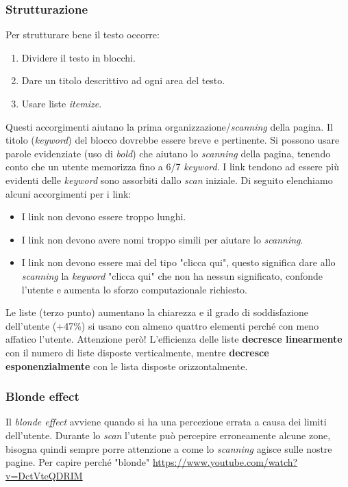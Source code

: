 			\subsubsection{Strutturazione}
				Per strutturare bene il testo occorre:
				\begin{enumerate}
					\item Dividere il testo in blocchi.
					\item Dare un titolo descrittivo ad ogni area del testo.
					\item Usare liste \emph{itemize}.
				\end{enumerate}
				Questi accorgimenti aiutano la prima organizzazione/\emph{scanning} della pagina. Il titolo (\emph{keyword}) del blocco dovrebbe essere breve e pertinente. Si possono usare parole evidenziate (uso di \emph{bold}) che aiutano lo \emph{scanning} della pagina, tenendo conto che un utente memorizza fino a 6/7 \emph{keyword}.
				I link tendono ad essere più evidenti delle \emph{keyword} sono assorbiti dallo \emph{scan} iniziale. Di seguito elenchiamo alcuni accorgimenti per i link:
				\begin{itemize}
					\item I link non devono essere troppo lunghi.
					\item I link non devono avere nomi troppo simili per aiutare lo \emph{scanning}.
					\item I link non devono essere mai del tipo "clicca qui", questo significa dare allo \emph{scanning} la \emph{keyword} "clicca qui" che non ha nessun significato, confonde l'utente e aumenta lo sforzo computazionale richiesto.
				\end{itemize}
				Le liste (terzo punto) aumentano la chiarezza e il grado di soddisfazione dell'utente (+47\%) si usano con almeno quattro elementi perché con meno affatico l'utente. Attenzione però! L'efficienza delle liste \textbf{decresce linearmente} con il numero di liste disposte verticalmente, mentre \textbf{decresce esponenzialmente} con le lista disposte orizzontalmente.
				
			\subsubsection{Blonde effect}
				Il \emph{blonde effect} avviene quando si ha una percezione errata a causa dei limiti dell'utente. Durante lo \emph{scan} l'utente può percepire erroneamente alcune zone, bisogna quindi sempre porre attenzione a come lo \emph{scanning} agisce sulle nostre pagine.
			Per capire perché "blonde" \url{https://www.youtube.com/watch?v=DctVteQDRIM}